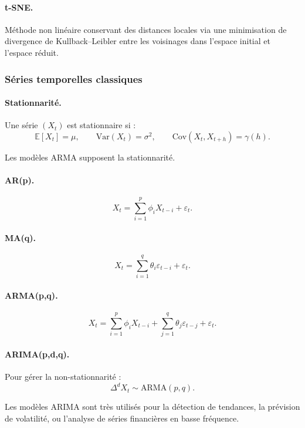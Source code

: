 \documentclass[11pt,a4paper]{article}
\newcommand{\1}{\mathbf{1}}
\begin{document}
\paragraph{t-SNE.}

Méthode non linéaire conservant des distances locales via une minimisation de
divergence de Kullback--Leibler entre les voisinages dans l'espace initial et
l'espace réduit.

\subsubsection{Séries temporelles classiques}

\paragraph{Stationnarité.}

Une série $(X_t)$ est stationnaire si :
\[
\mathbb{E}[X_t] = \mu,
\qquad
\mathrm{Var}(X_t) = \sigma^2,
\qquad
\mathrm{Cov}(X_t, X_{t+h}) = \gamma(h).
\]

Les modèles ARMA supposent la stationnarité.

\paragraph{AR(p).}
\[
X_t = \sum_{i=1}^p \phi_i X_{t-i} + \varepsilon_t.
\]

\paragraph{MA(q).}
\[
X_t = \sum_{i=1}^q \theta_i \varepsilon_{t-i} + \varepsilon_t.
\]

\paragraph{ARMA(p,q).}
\[
X_t
= \sum_{i=1}^p \phi_i X_{t-i}
+ \sum_{j=1}^q \theta_j \varepsilon_{t-j}
+ \varepsilon_t.
\]

\paragraph{ARIMA(p,d,q).}

Pour gérer la non-stationnarité :
\[
\Delta^d X_t \sim \mathrm{ARMA}(p,q).
\]

Les modèles ARIMA sont très utilisés pour la détection de tendances, la prévision
de volatilité, ou l'analyse de séries financières en basse fréquence.
\end{document}
